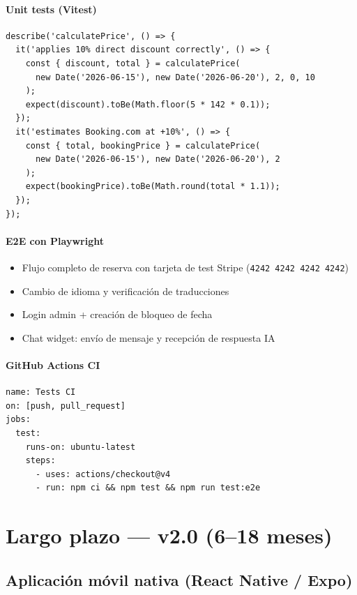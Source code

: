 \documentclass[12pt,a4paper,twoside,openright]{report}
\begin{document}
\paragraph{Unit tests (Vitest)}

\begin{lstlisting}[style=tsStyle]
describe('calculatePrice', () => {
  it('applies 10% direct discount correctly', () => {
    const { discount, total } = calculatePrice(
      new Date('2026-06-15'), new Date('2026-06-20'), 2, 0, 10
    );
    expect(discount).toBe(Math.floor(5 * 142 * 0.1));
  });
  it('estimates Booking.com at +10%', () => {
    const { total, bookingPrice } = calculatePrice(
      new Date('2026-06-15'), new Date('2026-06-20'), 2
    );
    expect(bookingPrice).toBe(Math.round(total * 1.1));
  });
});
\end{lstlisting}

\paragraph{E2E con Playwright}
\begin{itemize}
  \item Flujo completo de reserva con tarjeta de test Stripe (\texttt{4242 4242 4242 4242})
  \item Cambio de idioma y verificación de traducciones
  \item Login admin + creación de bloqueo de fecha
  \item Chat widget: envío de mensaje y recepción de respuesta IA
\end{itemize}

\paragraph{GitHub Actions CI}
\begin{lstlisting}[style=bashStyle]
name: Tests CI
on: [push, pull_request]
jobs:
  test:
    runs-on: ubuntu-latest
    steps:
      - uses: actions/checkout@v4
      - run: npm ci && npm test && npm run test:e2e
\end{lstlisting}

\section{Largo plazo — v2.0 (6–18 meses)}

\subsection{Aplicación móvil nativa (React Native / Expo)}
\end{document}
